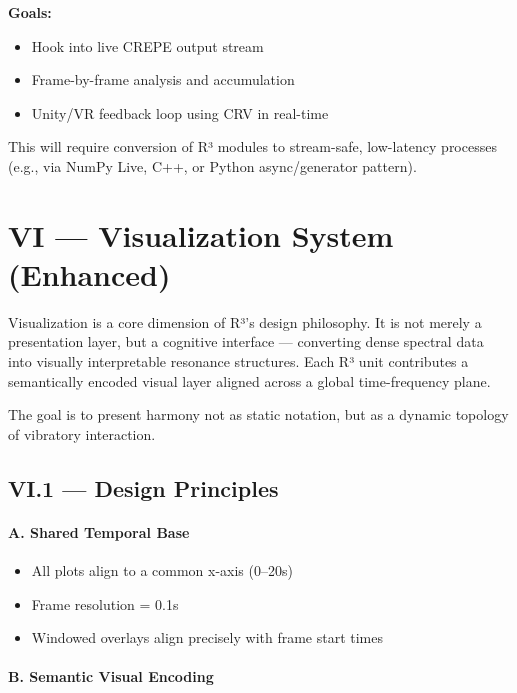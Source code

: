 \documentclass{article}
\begin{document}
\textbf{Goals:}

\begin{itemize}
    \item Hook into live CREPE output stream
    \item Frame-by-frame analysis and accumulation
    \item Unity/VR feedback loop using CRV in real-time
\end{itemize}

This will require conversion of R³ modules to stream-safe, low-latency processes (e.g., via NumPy Live, C++, or Python async/generator pattern).

\section*{VI — Visualization System (Enhanced)}

Visualization is a core dimension of R³’s design philosophy. It is not merely a presentation layer, but a cognitive interface — converting dense spectral data into visually interpretable resonance structures. Each R³ unit contributes a semantically encoded visual layer aligned across a global time-frequency plane.

The goal is to present harmony not as static notation, but as a dynamic topology of vibratory interaction.

\subsection*{VI.1 — Design Principles}

\paragraph{A. Shared Temporal Base}

\begin{itemize}
    \item All plots align to a common x-axis (0–20s)
    \item Frame resolution = 0.1s
    \item Windowed overlays align precisely with frame start times
\end{itemize}

\paragraph{B. Semantic Visual Encoding}
\end{document}
